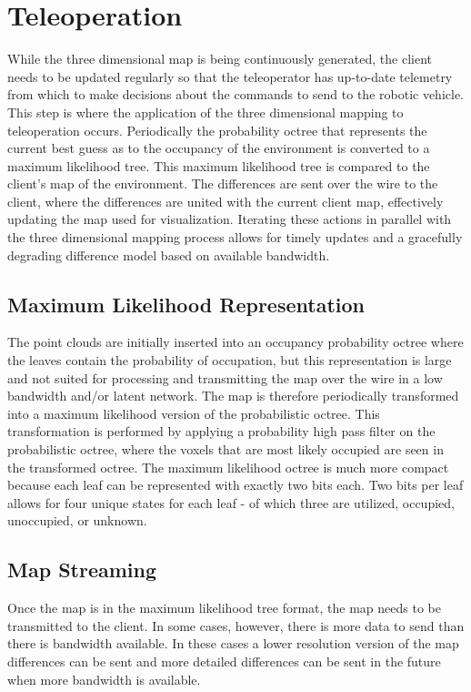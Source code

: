\documentclass[12pt]{report}
\begin{document}
\chapter{Teleoperation}\label{chap:teleoperation}
While the three dimensional map is being continuously generated, the client needs to be updated regularly so that the teleoperator has up-to-date telemetry from which to make decisions about the commands to send to the robotic vehicle. This step is where the application of the three dimensional mapping to teleoperation occurs. Periodically the probability octree that represents the current best guess as to the occupancy of the environment is converted to a maximum likelihood tree.  This maximum likelihood tree is compared to the client's map of the environment.  The differences are sent over the wire to the client, where the differences are united with the current client map, effectively updating the map used for visualization.  Iterating these actions in parallel with the three dimensional mapping process allows for timely updates and a gracefully degrading difference model based on available bandwidth.

\section{Maximum Likelihood Representation}
The point clouds are initially inserted into an occupancy probability octree where the leaves contain the probability of occupation, but this representation is large and not suited for processing and transmitting the map over the wire in a low bandwidth and/or latent network. The map is therefore periodically transformed into a maximum likelihood version of the probabilistic octree. This transformation is performed by applying a probability high pass filter on the probabilistic octree, where the voxels that are most likely occupied are seen in the transformed octree. The maximum likelihood octree is much more compact because each leaf can be represented with exactly two bits each\cite{octomap}.  Two bits per leaf allows for four unique states for each leaf - of which three are utilized, occupied, unoccupied, or unknown.

\section{Map Streaming}
Once the map is in the maximum likelihood tree format, the map needs to be transmitted to the client. In some cases, however, there is more data to send than there is bandwidth available. In these cases a lower resolution version of the map differences can be sent and more detailed differences can be sent in the future when more bandwidth is available.
\end{document}
